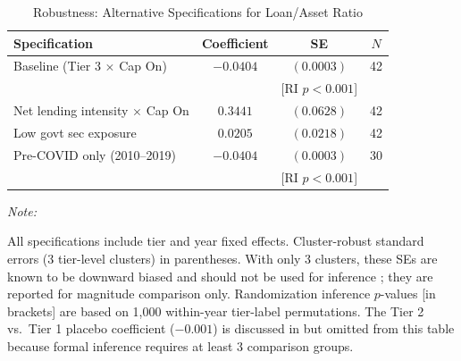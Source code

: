 \begin{table}[!h]
\centering
\caption{Robustness: Alternative Specifications for Loan/Asset Ratio}
\label{tab:robustness}
\centering
\begin{threeparttable}
\begin{tabular}[t]{lccc}
\toprule
Specification & Coefficient & SE & $N$\\
\midrule
Baseline (Tier 3 $\times$ Cap On) & $-0.0404$ & $(0.0003)$ & 42\\
 & & {[RI $p < 0.001$]} & \\
Net lending intensity $\times$ Cap On & $0.3441$ & $(0.0628)$ & 42\\
Low govt sec exposure & $0.0205$ & $(0.0218)$ & 42\\
Pre-COVID only (2010--2019) & $-0.0404$ & $(0.0003)$ & 30\\
 & & {[RI $p < 0.001$]} & \\
\bottomrule
\end{tabular}
\begin{tablenotes}
\item \textit{Note:}
\item All specifications include tier and year fixed effects. Cluster-robust standard errors (3 tier-level clusters) in parentheses. With only 3 clusters, these SEs are known to be downward biased and should not be used for inference \citep{cameron2008bootstrap}; they are reported for magnitude comparison only. Randomization inference $p$-values [in brackets] are based on 1,000 within-year tier-label permutations. The Tier 2 vs.\ Tier 1 placebo coefficient ($-0.001$) is discussed in  but omitted from this table because formal inference requires at least 3 comparison groups.
\end{tablenotes}
\end{threeparttable}
\end{table}
